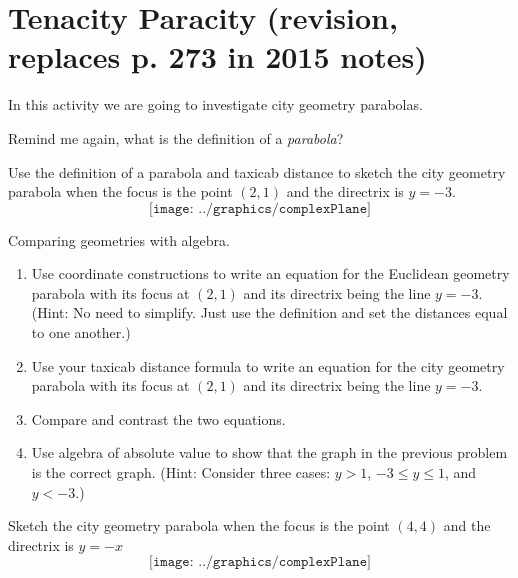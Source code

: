 \newpage
\section{Tenacity Paracity (revision, replaces p. 273 in 2015 notes)}
                                  

In this activity we are going to investigate city geometry parabolas.

\begin{prob} 
Remind me again, what is the definition of a \textit{parabola}?
\end{prob}
\vspace{0.5in}

\begin{prob}
Use the definition of a parabola and taxicab distance to sketch the city geometry parabola when the focus is the point $(2,1)$
and the directrix is $y=-3$. 
\[
\texttt{[image: ../graphics/complexPlane]}
\]
\end{prob}

\break
\begin{prob}
Comparing geometries with algebra. 
\begin{enumerate}
\item Use coordinate constructions to write an equation for the Euclidean geometry parabola with its focus at $(2,1)$ and its directrix being the line $y=-3$.  (Hint:  No need to simplify.  Just use the definition and set the distances equal to one another.)  
\vspace{0.5in}
\item Use your taxicab distance formula to write an equation for the city geometry parabola with its focus at $(2,1)$ and its directrix being the line $y=-3$.  
\vspace{0.5in}
\item Compare and contrast the two equations.  
\vspace{0.5in}
\item Use algebra of absolute value to show that the graph in the previous problem is the correct graph. 
 (Hint:  Consider three cases: $y>1$, $-3\leq y \leq 1$, and $y<-3$.)
\vfill
\end{enumerate}
\end{prob}

\break

\begin{prob}
Sketch the city geometry parabola when the focus is the point $(4,4)$
and the directrix is $y=-x$
\[
\texttt{[image: ../graphics/complexPlane]}
\]
\end{prob}

